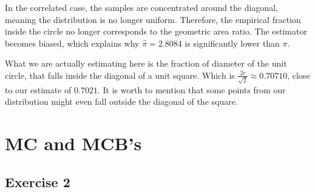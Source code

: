 \documentclass{article}
\begin{document}
\begin{enumerate}
    In the correlated case, the samples are concentrated around the diagonal, meaning the distribution is no longer uniform. Therefore, the empirical fraction inside the circle no longer corresponds to the geometric area ratio. The estimator becomes biased, which explains why $\hat{\pi} = 2.8084$ is significantly lower than $\pi$.

    What we are actually estimating here is the fraction of diameter of the unit circle, that falls inside the diagonal of a unit square. Which is $\frac{2r}{\sqrt{2}} \approx 0.70710$, close to our estimate of $0.7021$. It is worth to mention that some points from our distribution might even fall outside the diagonal of the square. 
    
\end{enumerate}

\section{MC and MCB's}
\subsection*{Exercise 2}
\end{document}
